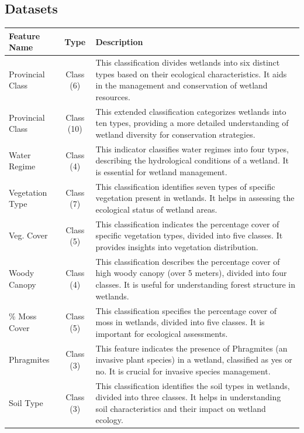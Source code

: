\documentclass[12pt,letterpaper]{article}
\begin{document}
\subsection{Datasets}
\begin{table}[h]
    \centering
    \begin{tabular}{|m{3cm}|c|m{11cm}|}
        \hline
        \textbf{Feature Name} & \textbf{Type} & \textbf{Description} \\
        \hline
        Provincial Class & Class (6) & This classification divides wetlands into six distinct types based on their ecological characteristics. It aids in the management and conservation of wetland resources. \\
        \hline
        Provincial Class & Class (10) & This extended classification categorizes wetlands into ten types, providing a more detailed understanding of wetland diversity for conservation strategies. \\
        \hline
        Water Regime & Class (4) & This indicator classifies water regimes into four types, describing the hydrological conditions of a wetland. It is essential for wetland management. \\
        \hline
        Vegetation Type & Class (7) & This classification identifies seven types of specific vegetation present in wetlands. It helps in assessing the ecological status of wetland areas. \\
        \hline
        Veg. Cover & Class (5) & This classification indicates the percentage cover of specific vegetation types, divided into five classes. It provides insights into vegetation distribution. \\
        \hline
        Woody Canopy & Class (4) & This classification describes the percentage cover of high woody canopy (over 5 meters), divided into four classes. It is useful for understanding forest structure in wetlands. \\
        \hline
        \% Moss Cover & Class (5) & This classification specifies the percentage cover of moss in wetlands, divided into five classes. It is important for ecological assessments. \\
        \hline
        Phragmites  & Class (3) & This feature indicates the presence of Phragmites (an invasive plant species) in a wetland, classified as yes or no. It is crucial for invasive species management. \\
        \hline
        Soil Type & Class (3) & This classification identifies the soil types in wetlands, divided into three classes. It helps in understanding soil characteristics and their impact on wetland ecology. \\

\end{tabular}
\end{table}
\end{document}

